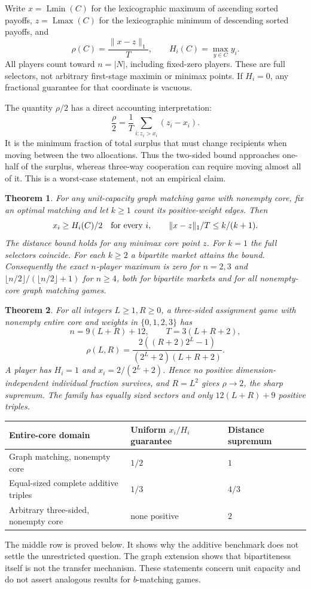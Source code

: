 \documentclass[11pt]{article}
\newtheorem{theorem}{Theorem}
\newcommand{\Lmin}{\operatorname{Lmin}}
\newcommand{\Lmax}{\operatorname{Lmax}}
\begin{document}
Write $x=\Lmin(C)$ for the lexicographic maximum of ascending sorted payoffs,
$z=\Lmax(C)$ for the lexicographic minimum of descending sorted payoffs, and
\[
 \rho(C)=\frac{\|x-z\|_1}{T},\qquad
 H_i(C)=\max_{y\in C}y_i.
\]
All players count toward $n=|N|$, including fixed-zero players. These are full
selectors, not arbitrary first-stage maximin or minimax points. If $H_i=0$,
any fractional guarantee for that coordinate is vacuous.

The quantity $\rho/2$ has a direct accounting interpretation:
\[
 \frac{\rho}{2}=\frac1T\sum_{i:z_i>x_i}(z_i-x_i).
\]
It is the minimum fraction of total surplus that must change recipients when
moving between the two allocations. Thus the two-sided bound approaches
one-half of the surplus, whereas three-way cooperation can require moving
almost all of it. This is a worst-case statement, not an empirical claim.

\begin{theorem}\label{thm:sharp}
For any unit-capacity graph matching game with nonempty core, fix an optimal
matching and let $k\ge1$ count its positive-weight edges. Then
\[
 x_i\ge H_i(C)/2\quad\hbox{for every }i,\qquad
 \|x-z\|_1/T\le k/(k+1).
\]
The distance bound holds for any minimax core point $z$. For $k=1$ the full
selectors coincide. For each $k\ge2$ a bipartite market attains the bound.
Consequently the exact $n$-player maximum is zero for $n=2,3$ and
$\lfloor n/2\rfloor/(\lfloor n/2\rfloor+1)$ for $n\ge4$, both for bipartite
markets and for all nonempty-core graph matching games.
\end{theorem}

\begin{theorem}\label{thm:main}
For all integers $L\ge1,R\ge0$, a three-sided assignment game with nonempty
entire core and weights in $\{0,1,2,3\}$ has
\[
 n=9(L+R)+12,\qquad T=3(L+R+2),
\]
\begin{equation}\label{eq:rho}
 \rho(L,R)=\frac{2((R+2)2^L-1)}{(2^L+2)(L+R+2)}.
\end{equation}
A player has $H_i=1$ and $x_i=2/(2^L+2)$. Hence no positive
 dimension-independent individual fraction survives, and $R=L^2$ gives
$\rho\to2$, the sharp supremum. The family has equally sized sectors and
only $12(L+R)+9$ positive triples.
\end{theorem}

\begin{center}
\small
\begin{tabular}{lll}
\toprule
Entire-core domain & Uniform $x_i/H_i$ guarantee & Distance supremum\\
\midrule
Graph matching, nonempty core & $1/2$ & $1$\\
Equal-sized complete additive triples & $1/3$ & $4/3$\\
Arbitrary three-sided, nonempty core & none positive & $2$\\
\bottomrule
\end{tabular}
\end{center}
The middle row is proved below. It shows why the additive benchmark does not
settle the unrestricted question. The graph extension shows that
bipartiteness itself is not the transfer mechanism. These statements concern
unit capacity and do not assert analogous results for $b$-matching games.
\end{document}
